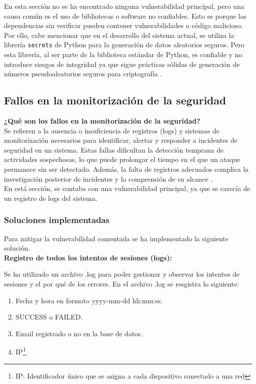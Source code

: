 \documentclass[a4paper,12pt]{article}
\newcommand{\code}[1]{\texttt{#1}}  %
\begin{document}
En esta sección no se ha encontrado ninguna vulnerabilidad principal, pero una causa común es el uso de bibliotecas o software no confiables. Esto es porque las dependencias sin verificar pueden contener vulnerabilidades o código malicioso.\\ 

Por ello, cabe mencionar que en el desarrollo del sistema actual, se utiliza la librería \code{secrets} de Python para la generación de datos aleatorios seguros. Pero esta librería, al ser parte de la biblioteca estándar de Python, es confiable y no introduce riesgos de integridad ya que sigue prácticas sólidas de generación de números pseudoaleatorios seguros para criptografía \cite{secrets Python}.



\vspace{1em}
\subsection{Fallos en la monitorización de la seguridad}
\vspace{1em}
\textbf{¿Qué son los fallos en la monitorización de la seguridad?\\}
Se refieren a la ausencia o insuficiencia de registros (logs) y sistemas de monitorización necesarios para identificar, alertar y responder a incidentes de seguridad en un sistema. Estas fallas dificultan la detección temprana de actividades sospechosas, lo que puede prolongar el tiempo en el que un ataque permanece sin ser detectado. Además, la falta de registros adecuados complica la investigación posterior de incidentes y la comprensión de su alcance \cite{fallos_monit}. \\

En está sección, se contaba con una vulnerabilidad principal, ya que se carecía de un registro de logs del sistema.
\subsubsection{Soluciones implementadas}

Para mitigar la vulnerabilidad comentada se ha implementado la siguiente solución.\\

\textbf{Registro de todos los intentos de sesiones (logs):}

Se ha utilizado un archivo .log para poder gestionar y observar los intentos de sesiones y el por qué de los errores. En el archivo .log se resgistra lo siguiente:
\begin{enumerate}
	\item Fecha y hora en formato yyyy-mm-dd hh:mm:ss.
	\item SUCCESS o FAILED.
	\item Email registrado o no en la base de datos.
	\item IP\footnote{IP: Identificador único que se asigna a cada dispositivo conectado a una red}.
\end{enumerate} 
\end{document}
